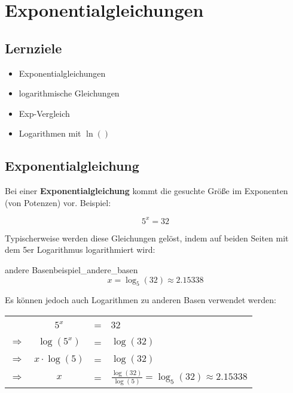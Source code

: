 

\section{Exponentialgleichungen}

\subsection*{Lernziele}

\begin{itemize}
\item Exponentialgleichungen
  \item logarithmische Gleichungen 
\item Exp-Vergleich
\item Logarithmen mit $\ln()$
\end{itemize}

\subsection{Exponentialgleichung}
Bei einer \textbf{Exponentialgleichung} kommt die gesuchte Größe im
Exponenten (von Potenzen) vor. Beispiel:

$$5^x = 32$$

Typischerweise werden diese Gleichungen gelöst, indem auf beiden
Seiten mit dem 5er Logarithmus logarithmiert wird:

\begin{beispiel}{andere Basen}{beispiel_andere_basen}
$$x=\log_5(32) \approx 2.15338$$

Es können jedoch auch Logarithmen zu anderen Basen verwendet werden:

\begin{tabular}{rccl}
  \             & $5^x$           &=&    32          \\
  $\Rightarrow$ & $\log(5^x)$     &=&  $\log(32)$     \\
  $\Rightarrow$ & $x\cdot\log(5)$ &=&  $\log(32)$     \\
  $\Rightarrow$ & $x$             &=&  $\frac{\log(32)}{\log(5)} = \log_5(32) \approx 2.15338$ 
\end{tabular}
\end{beispiel}
\newpage

